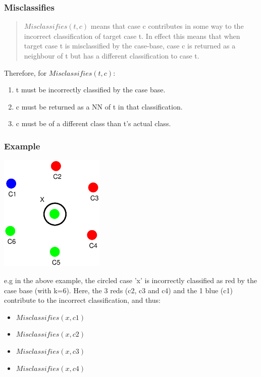 \documentclass[a4paper,11pt]{report}
\begin{document}
\subsubsection{Misclassifies}

\begin{quote}
$ Misclassifies(t, c ) $ means that case c contributes in some way to the incorrect classification of target case t. In effect this means that when target case t is misclassified by the case-base, case c is returned as a neighbour of t but has a different classification to case t.
\end{quote}
\citet{Delany2009}

Therefore, for $ Misclassifies(t, c) $:
\begin{enumerate}
	\item t must be incorrectly classified by the case base.
	\item c must be returned as a NN of t in that classification.
	\item c must be of a different class than t's actual class.
\end{enumerate}

\subsubsection{Example}
\includegraphics[width=5cm]{EqualDistanceMisclassifiesEg}

e.g  in the above example, the circled case 'x' is incorrectly classified as red by the case base (with k=6). Here, the 3 reds (c2, c3 and c4) and the 1 blue (c1) contribute to the incorrect classification, and thus:
\begin{itemize}
	\item $ Misclassifies(x, c1) $
	\item $ Misclassifies(x, c2) $
	\item $ Misclassifies(x, c3) $
	\item $ Misclassifies(x, c4) $
\end{itemize}
\end{document}
